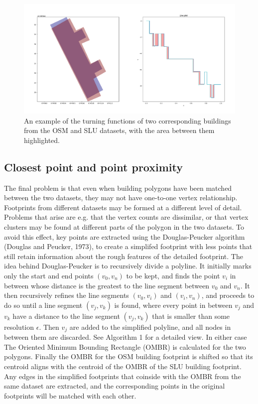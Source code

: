 \documentclass[a4paper]{article}
\begin{document}
\begin{figure}[H]
    \centering
    \includegraphics[width=\textwidth,height=0.5\textheight,keepaspectratio]{img_turn_function_diff_filled}
    \caption{An example of the turning functions of two corresponding buildings from the OSM and SLU datasets, with the area between them highlighted.}
    \label{fig:turning-function-compare}
\end{figure}

\subsection{Closest point and point proximity}

The final problem is that even when building polygons have been matched between the two datasets, they may not have one-to-one vertex relationship.
Footprints from different datasets may be formed at a different level of detail.
Problems that arise are e.g. that the vertex counts are dissimilar, or that vertex clusters may be found at different parts of the polygon in the two datasets.
To avoid this effect, key points are extracted using the Douglas-Peucker algorithm (Douglas and Peucker, 1973), to create a simplifed footprint with less points that still retain information about the rough features of the detailed footprint.
The idea behind Douglas-Peucker is to recursively divide a polyline.
It initially marks only the start and end points $(v_0, v_n)$ to be kept, and finds the point $v_i$ in between whose distance is the greatest to the line segment between $v_0$ and $v_n$.
It then recursively refines the line segments $(v_0, v_i)$ and $(v_i, v_n)$, and proceeds to do so until a line segment $(v_j, v_k)$ is found, where every point in between $v_j$ and $v_k$ have a distance to the line segment $(v_j, v_k)$ that is smaller than some resolution $\epsilon$.
Then $v_j$ are added to the simplified polyline, and all nodes in between them are discarded.
See Algorithm 1 for a detailed view.
In either case The Oriented Minimum Bounding Rectangle (OMBR) is calculated for the two polygons.
Finally the OMBR for the OSM building footprint is shifted so that its centroid aligns with the centroid of the OMBR of the SLU building footprint.
Any edges in the simplified footprints that coinside with the OMBR from the same dataset are extracted, and the corresponding points in the original footprints will be matched with each other.
\end{document}
